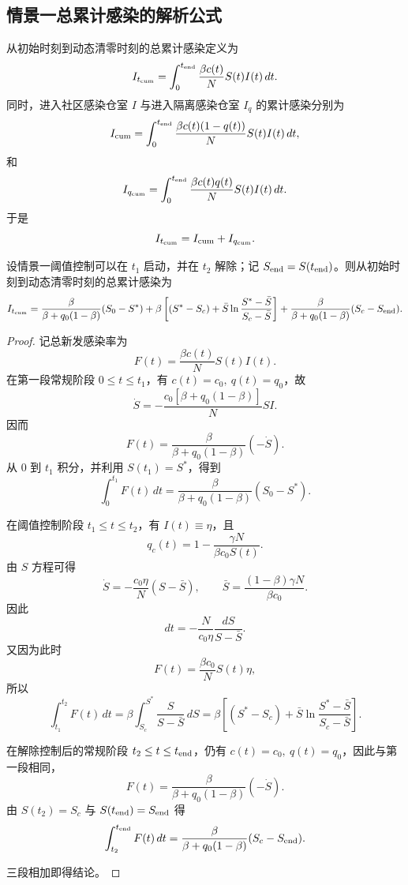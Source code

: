 \documentclass[lang=cn,a4paper,newtx]{elegantpaper}
\numberwithin{equation}{section}
\theoremstyle{plain}
\newcommand{\Itcum}{I_{t_{\mathrm{cum}}}}
\begin{document}
\subsection{情景一总累计感染的解析公式}
从初始时刻到动态清零时刻的总累计感染定义为
\begin{equation}
\Itcum
=
\int_0^{t_{\rm end}}\frac{\beta c(t)}{N}S(t)I(t)\,dt.
\end{equation}
同时，进入社区感染仓室 $I$ 与进入隔离感染仓室 $I_q$ 的累计感染分别为
\begin{equation}
I_{\rm cum}
=
\int_0^{t_{\rm end}}
\frac{\beta c(t)(1-q(t))}{N}S(t)I(t)\,dt,
\end{equation}
和
\begin{equation}
I_{q_{\rm cum}}
=
\int_0^{t_{\rm end}}
\frac{\beta c(t)q(t)}{N}S(t)I(t)\,dt.
\end{equation}
于是
\[
\Itcum=I_{\rm cum}+I_{q_{\rm cum}}.
\]

\begin{theorem}\label{thm:s1:Itcum}
    设情景一阈值控制可以在 $t_1$ 启动，并在 $t_2$ 解除；记
    $S_{\rm end}=S(t_{\rm end})$。则从初始时刻到动态清零时刻的总累计感染为
    \[
    \Itcum
    =
    \frac{\beta}{\beta+q_0(1-\beta)}(S_0-S^*)
    +
    \beta\left[
    (S^*-S_c)+\bar S\ln\frac{S^*-\bar S}{S_c-\bar S}
    \right]
    +
    \frac{\beta}{\beta+q_0(1-\beta)}(S_c-S_{\rm end}).
    \]
\end{theorem}
\begin{proof}
    记总新发感染率为
    \[
    F(t)=\frac{\beta c(t)}{N}S(t)I(t).
    \]
    在第一段常规阶段 $0\le t\le t_1$，有 $c(t)=c_0,\ q(t)=q_0$，故
    \[
    \dot S
    =
    -\frac{c_0[\beta+q_0(1-\beta)]}{N}SI.
    \]
    因而
    \[
    F(t)
    =
    \frac{\beta}{\beta+q_0(1-\beta)}(-\dot S).
    \]
    从 $0$ 到 $t_1$ 积分，并利用 $S(t_1)=S^*$，得到
    \[
    \int_0^{t_1}F(t)\,dt
    =
    \frac{\beta}{\beta+q_0(1-\beta)}(S_0-S^*).
    \]

    在阈值控制阶段 $t_1\le t\le t_2$，有 $I(t)\equiv\eta$，且
    \[
    q_c(t)=1-\frac{\gamma N}{\beta c_0S(t)}.
    \]
    由 $S$ 方程可得
    \[
    \dot S
    =
    -\frac{c_0\eta}{N}(S-\bar S),
    \qquad
    \bar S=\frac{(1-\beta)\gamma N}{\beta c_0}.
    \]
    因此
    \[
    dt
    =
    -\frac{N}{c_0\eta}\frac{dS}{S-\bar S}.
    \]
    又因为此时
    \[
    F(t)=\frac{\beta c_0}{N}S(t)\eta,
    \]
    所以
    \[
    \int_{t_1}^{t_2}F(t)\,dt
    =
    \beta\int_{S_c}^{S^*}\frac{S}{S-\bar S}\,dS
    =
    \beta\left[
    (S^*-S_c)+\bar S\ln\frac{S^*-\bar S}{S_c-\bar S}
    \right].
    \]

    在解除控制后的常规阶段 $t_2\le t\le t_{\rm end}$，仍有
    $c(t)=c_0,\ q(t)=q_0$，因此与第一段相同，
    \[
    F(t)
    =
    \frac{\beta}{\beta+q_0(1-\beta)}(-\dot S).
    \]
    由 $S(t_2)=S_c$ 与 $S(t_{\rm end})=S_{\rm end}$ 得
    \[
    \int_{t_2}^{t_{\rm end}}F(t)\,dt
    =
    \frac{\beta}{\beta+q_0(1-\beta)}(S_c-S_{\rm end}).
    \]

    三段相加即得结论。
\end{proof}
\end{document}

